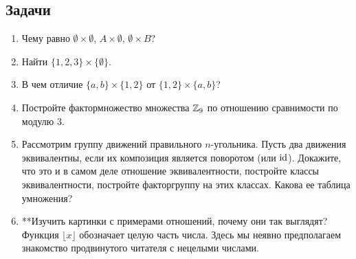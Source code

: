 \subsection*{Задачи}
\begin{enumerate}
\item Чему равно $\emptyset\times\emptyset$, $A\times\emptyset$, $\emptyset\times B$?
\item Найти $\{1,2,3\}\times\{\emptyset\}$.
\item В чем отличие $\{a,b\}\times\{1,2\}$ от $\{1,2\}\times\{a,b\}$?
\item Постройте фактормножество множества $\mathbb Z_9$ по отношению сравнимости по модулю $3$.
\item Рассмотрим группу движений правильного $n$-угольника. Пусть два движения эквивалентны, если их композиция является поворотом (или $\mathrm{id}$). Докажите, что это и в самом деле отношение эквивалентности, постройте классы эквивалентности, постройте факторгруппу на этих классах. Какова ее таблица умножения?
\item **Изучить картинки с примерами отношений, почему они так выглядят? Функция $\lfloor x\rfloor$ обозначает целую часть числа. Здесь мы неявно предполагаем знакомство продвинутого читателя с нецелыми числами.
\end{enumerate}
